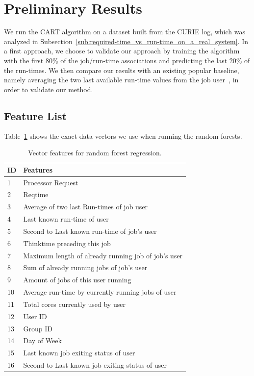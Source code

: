 \documentclass{article}
\begin{document}

\section{Preliminary Results}
\label{sec:preliminary_results}
We run the CART algorithm on a dataset built from the CURIE log, which was analyzed in Subsection~\ref{sub:required-time_vs_run-time_on_a_real_system}. In a first approach, we choose to validate our approach by training the algorithm with the first 80\% of the job/run-time associations and predicting the last 20\% of the run-times. We then compare our results with an existing popular baseline, namely averaging the two last available run-time values from the job user~\cite{tsafir}, in order to validate our method.

\subsection{Feature List}
\label{sub:feature_list}
Table~\ref{tab:features} shows the exact data vectors we use when running the random forests.

\begin{table}[!ht]
  \centering
  \begin{tabular}{|l|l|}
    \hline
    ID & Features \\
    \hline
    1  &  Processor Request  \\
    2  &  Reqtime  \\
    3  &  Average of two last Run-times of job user \\
    4  &  Last known run-time of user\\
    5  &  Second to Last known run-time of job's user \\
    6  &  Thinktime preceding this job \\
    7  &  Maximum length of already running job of job's user\\
    8  &  Sum of already running jobs of job's user\\
    9  &  Amount of jobs of this user running \\
    10 &  Average run-time by currently running jobs of user\\
    11 &  Total cores currently used by user\\
    12 &  User ID \\
    13 &  Group ID\\
    14 &  Day of Week\\
    15 &  Last known job exiting status of user\\
    16 &  Second to  Last known job exiting status of user\\
    \hline
  \end{tabular}
  \caption{Vector features for random forest regression.}
  \label{tab:features}
\end{table}
\end{document}
